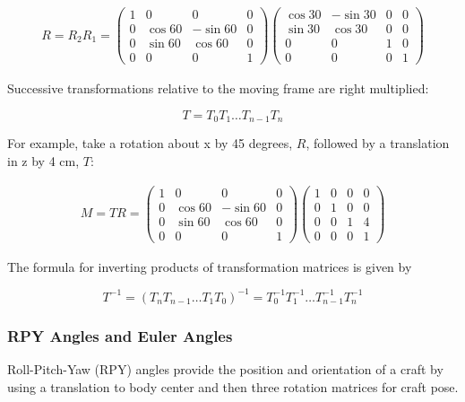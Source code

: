 \[\begin{aligned}
R = R_2R_1= \begin{pmatrix}1 & 0 & 0 & 0 \\ 0 & \cos 60 & -\sin 60 & 0  \\
         0& \sin 60 & \cos 60 & 0 \\
         0& 0& 0& 1 \end{pmatrix}\begin{pmatrix}\cos 30 & -\sin 30 & 0 & 0 \\
         \sin 30 & \cos 30 & 0 & 0\\ 0 &0 & 1 & 0 \\
         0& 0& 0& 1 \end{pmatrix}
\end{aligned}\]

Successive transformations relative to the moving frame are right
multiplied:

\[T = T_0 T_{1} \dots T_{n-1} T_n\]

For example, take a rotation about x by 45 degrees, \(R\), followed by a
translation in z by 4 cm, \(T\):

\[\begin{aligned}
M = TR= \begin{pmatrix}1 & 0 & 0 & 0 \\ 0 & \cos 60 & -\sin 60 & 0  \\
         0& \sin 60 & \cos 60 & 0 \\
         0& 0& 0& 1 \end{pmatrix}\begin{pmatrix}1 & 0 & 0 & 0 \\
         0 & 1 & 0 & 0\\ 0 &0 & 1 & 4 \\
         0& 0& 0& 1 \end{pmatrix}
\end{aligned}\]

The formula for inverting products of transformation matrices is given
by

\[T^{-1} = \left( T_n T_{n-1} \dots T_1 T_0 \right)^{-1}
  = T_0^{-1} T_{1}^{-1} \dots T_{n-1}^{-1} T_n^{-1}\]

\hypertarget{rpy-angles-and-euler-angles}{%
\subsubsection{RPY Angles and Euler
Angles}\label{rpy-angles-and-euler-angles}}

Roll-Pitch-Yaw (RPY) angles provide the position and orientation of a
craft by using a translation to body center and then three rotation
matrices for craft pose.

